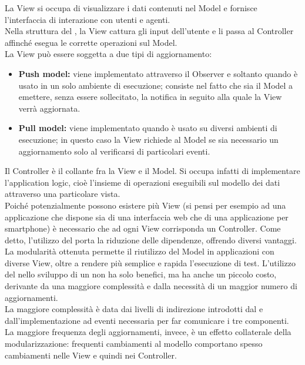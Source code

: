 			La View si occupa di visualizzare i dati contenuti nel Model e fornisce l'interfaccia di interazione con utenti e agenti.\\
			Nella struttura del  , la View cattura gli input dell'utente e li passa al Controller affinché esegua le corrette operazioni sul Model. \\
			La View può essere soggetta a due tipi di aggiornamento:
			\begin{itemize}
				\item \textbf{Push model:} viene implementato attraverso il  Observer e soltanto quando  è usato in un solo ambiente di esecuzione; consiste nel fatto che sia il Model a emettere, senza essere sollecitato, la notifica in seguito alla quale la View verrà aggiornata.
				\item \textbf{Pull model:} viene implementato quando  è usato su diversi ambienti di esecuzione; in questo caso la View richiede al Model se sia necessario un aggiornamento solo al verificarsi di particolari eventi.
			\end{itemize}
			Il Controller è il collante fra la View e il Model. Si occupa infatti di implementare l'application logic, cioè l'insieme di operazioni eseguibili sul modello dei dati attraverso una particolare vista.\\
			Poiché potenzialmente possono esistere più View (si pensi per esempio ad una applicazione che dispone sia di una interfaccia web che di una applicazione per smartphone) è necessario che ad ogni View corrisponda un Controller.
		Come detto, l'utilizzo del   porta la riduzione delle dipendenze, offrendo diversi vantaggi. La modularità ottenuta permette il riutilizzo del Model in applicazioni con diverse View, oltre a rendere più semplice e rapida l'esecuzione di test. 
		L'utilizzo del   nello sviluppo di un  non ha solo benefici, ma ha anche un piccolo costo, derivante da una maggiore complessità e dalla necessità di un maggior numero di aggiornamenti.\\
  		La maggiore complessità è data dai livelli di indirezione introdotti dal  e dall'implementazione ad eventi necessaria per far comunicare i tre componenti. La maggiore frequenza degli aggiornamenti, invece, è un effetto collaterale della modularizzazione: frequenti cambiamenti al modello comportano spesso cambiamenti nelle View e quindi nei Controller.

